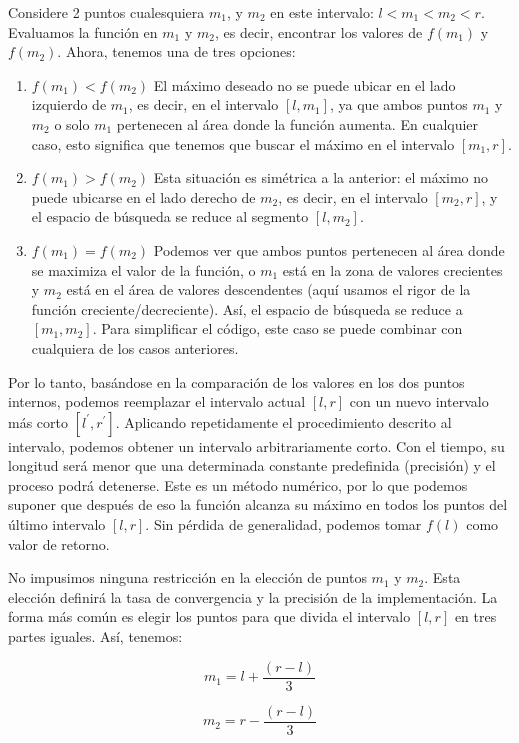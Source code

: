 Considere 2 puntos cualesquiera $m_1$, y $m_2$ en este intervalo: $l<m_1 <m_2 <r$. Evaluamos la función en $m_1$ y $m_2$, es decir, encontrar los valores de $f(m_1)$ y $f(m_2)$. Ahora, tenemos una de tres opciones:

\begin{enumerate}
	\item $f(m_1) < f(m_2)$ El máximo deseado no se puede ubicar en el lado izquierdo de 
	$m_1$, es decir, en el intervalo $[l,m_1]$, ya que ambos puntos $m_1$ y $m_2$ o solo 
	$m_1$ pertenecen al área donde la función aumenta. En cualquier caso, esto significa 
	que tenemos que buscar el máximo en el intervalo $[m_1,r]$.
	\item $f(m_1) > f(m_2)$ Esta situación es simétrica a la anterior: el máximo no puede ubicarse en el lado derecho de $m_2$, es decir, en el intervalo $[m_2,r]$, y el espacio de búsqueda se reduce al segmento $[l,m_2]$.
	\item $f(m_1) = f(m_2)$ Podemos ver que ambos puntos pertenecen al área donde se 
	maximiza el valor de la función, o $m_1$ está en la zona de valores crecientes y 
	$m_2$ está en el área de valores descendentes (aquí usamos el rigor de la función 
	creciente/decreciente). Así, el espacio de búsqueda se reduce a $[m_1, m_2]$. Para 
	simplificar el código, este caso se puede combinar con cualquiera de los casos 
	anteriores.
\end{enumerate}

Por lo tanto, basándose en la comparación de los valores en los dos puntos internos, 
podemos reemplazar el intervalo actual $[l,r]$ con un nuevo intervalo más corto
$[l^\prime, r^\prime]$. Aplicando repetidamente el procedimiento descrito al 
intervalo, podemos obtener un intervalo arbitrariamente corto. Con el tiempo, su 
longitud será menor que una determinada constante predefinida (precisión) y el proceso 
podrá detenerse. Este es un método numérico, por lo que podemos suponer que después de 
eso la función alcanza su máximo en todos los puntos del último intervalo $[l,r]$. 
Sin pérdida de generalidad, podemos tomar $f(l)$ como valor de retorno.

No impusimos ninguna restricción en la elección de puntos $m_1$ y $m_2$. Esta elección definirá la tasa de convergencia y la precisión de la implementación. La forma más común es elegir los puntos para que divida el intervalo $[l,r]$ en tres partes iguales. Así, tenemos:

$$m_1 = l + \frac{(r - l)}{3}$$

$$m_2 = r - \frac{(r - l)}{3}$$

